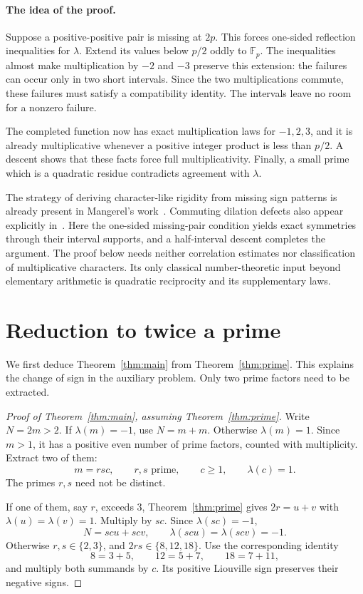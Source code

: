 \documentclass[11pt,a4paper]{article}
\theoremstyle{remark}
\numberwithin{equation}{section}
\newcommand{\Fp}{\mathbb F_p}
\newcommand{\lam}{\lambda}
\begin{document}
\paragraph{The idea of the proof.}
Suppose a positive-positive pair is missing at \(2p\). This forces
one-sided reflection inequalities for \(\lam\). Extend its values below
\(p/2\) oddly to \(\Fp\). The inequalities almost make multiplication by
\(-2\) and \(-3\) preserve this extension: the failures can occur only in
two short intervals. Since the two multiplications commute, these failures
must satisfy a compatibility identity. The intervals leave no room for a
nonzero failure.

The completed function now has exact multiplication laws for \(-1,2,3\),
and it is already multiplicative whenever a positive integer product is
less than \(p/2\). A descent shows that these facts force full
multiplicativity. Finally, a small prime which is a quadratic residue
contradicts agreement with \(\lam\).

The strategy of deriving character-like rigidity from missing sign
patterns is already present in Mangerel's
work~\cite{MangerelGoldbach,MangerelSigns}. Commuting dilation defects also
appear explicitly in~\cite[Section~2.2.2 and Lemma~4.3]{MangerelSigns}.
Here the one-sided missing-pair condition yields exact symmetries through
their interval supports, and a half-interval descent completes the
argument. The proof below needs neither correlation estimates nor
classification of multiplicative characters. Its only classical
number-theoretic input beyond elementary arithmetic is quadratic
reciprocity and its supplementary laws.

\section{Reduction to twice a prime}\label{sec:finish}

We first deduce Theorem~\ref{thm:main} from Theorem~\ref{thm:prime}.
This explains the change of sign in the auxiliary problem. Only two prime
factors need to be extracted.

\begin{proof}[Proof of Theorem~\ref{thm:main}, assuming Theorem~\ref{thm:prime}]
Write \(N=2m>2\). If \(\lam(m)=-1\), use \(N=m+m\).
Otherwise \(\lam(m)=1\). Since \(m>1\), it has a positive even number
of prime factors, counted with multiplicity. Extract two of them:
\[
  m=rsc,\qquad r,s\text{ prime},\qquad c\ge1,\qquad\lam(c)=1.
\]
The primes \(r,s\) need not be distinct.

If one of them, say \(r\), exceeds \(3\), Theorem~\ref{thm:prime}
gives \(2r=u+v\) with \(\lam(u)=\lam(v)=1\). Multiply by \(sc\).
Since \(\lam(sc)=-1\),
\[
  N=scu+scv,\qquad \lam(scu)=\lam(scv)=-1.
\]
Otherwise \(r,s\in\{2,3\}\), and \(2rs\in\{8,12,18\}\).
Use the corresponding identity
\[
  8=3+5,\qquad 12=5+7,\qquad 18=7+11,
\]
and multiply both summands by \(c\). Its positive Liouville sign
preserves their negative signs.
\end{proof}
\end{document}
